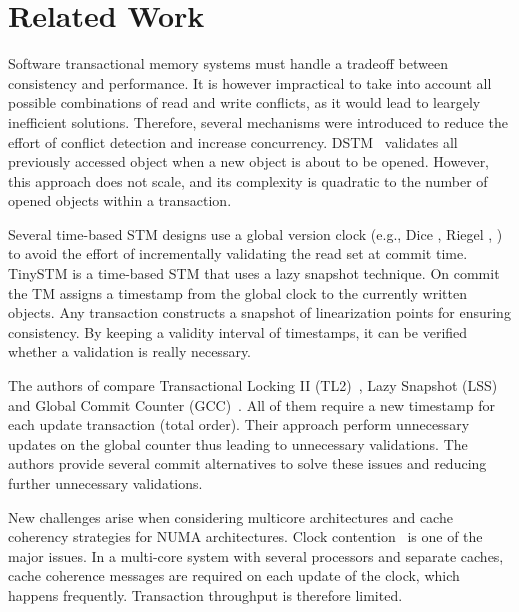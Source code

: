 \section{Related Work}

Software transactional memory systems must handle a tradeoff between consistency and performance.
It is however impractical to take into account all possible combinations of read and write conflicts, as it would lead to leargely inefficient solutions. 
Therefore, several mechanisms were introduced to reduce the effort of conflict detection and increase concurrency. 
DSTM~\cite{herlihy2003software} validates all previously accessed object when a new object is about to be opened. 
However, this approach does not scale, and its complexity is quadratic to the number of opened objects within a transaction.

Several time-based STM designs use a global version clock (e.g., Dice \cite{dice}, Riegel \cite{riegel2006lazy}, \cite{14}) to avoid the effort of incrementally validating the read set at commit time. 
TinySTM \cite{FelberFMR10} is a time-based STM that uses a lazy snapshot technique. 
On commit the TM assigns a timestamp from the global clock to the currently written objects. 
Any transaction constructs a snapshot of linearization points for ensuring consistency. 
By keeping a validity interval of timestamps, it can be verified whether a validation is really necessary. 

The authors of \cite{zhang2008commit} compare Transactional Locking II (TL2)~\cite{dice2006transactional}, Lazy Snapshot (LSS)\cite{riegel2006lazy} and Global Commit Counter (GCC)~\cite{spear2006conflict}. 
All of them require a new timestamp for each update transaction (total order).
Their approach perform unnecessary updates on the global counter thus leading to unnecessary validations. 
The authors provide several commit alternatives to solve these issues and reducing further unnecessary validations.

New challenges arise when considering multicore architectures and cache coherency strategies for NUMA architectures. 
Clock contention~\cite{6121290} is one of the major issues. 
In a multi-core system with several processors and separate caches, cache coherence messages are required on each update of the clock, which happens frequently. 
Transaction throughput is therefore limited.

